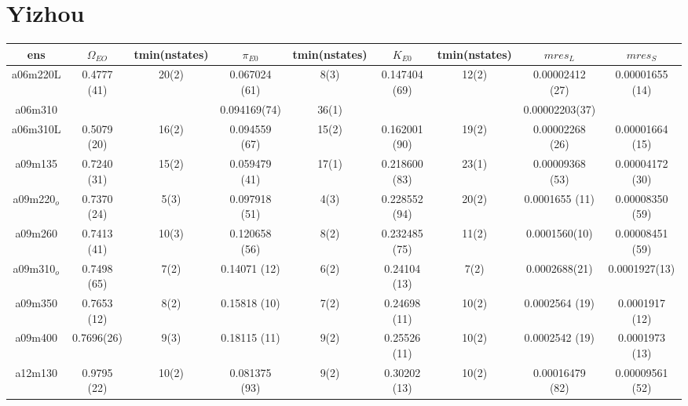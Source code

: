 \documentclass{article}
\begin{document}
 \section*{Yizhou}
\begin{table}[h!]
  \centering
 \setlength{\arrayrulewidth}{0.5mm}
\setlength{\tabcolsep}{13pt}
\renewcommand{\arraystretch}{2}
 \begin{tabular}{|| c |c | c | c | c | c | c | c | c ||} 
 \hline
 ens &  $\Omega_{EO}$ & tmin(nstates) & $\pi_{E0}$  & tmin(nstates)& $K_{E0}$  & tmin(nstates) & $mres_{L}$ & $mres_{S}$\\ [0.8ex] 
 \hline\hline
 a06m220L 
 & {0.4777 (41)}   &   {20(2)} & {0.067024 (61)}   & {8(3)}   & { 0.147404 (69)}  & {12(2)}   & { 0.00002412 (27)}  & { 0.00001655 (14)} \\ 
 \hline
 a06m310 
 & {}   &   {} & {0.094169(74)}   & {36(1)}   & {}  & {}   & {0.00002203(37)}  & {}  \\
 \hline
 a06m310L 
  & { 0.5079 (20)}   &   {16(2)} & {0.094559 (67)}   & {15(2)}   & { 0.162001 (90)}  & {19(2)}   & { 0.00002268 (26)}  & { 0.00001664 (15)}  \\
 \hline
 a09m135 
 & { 0.7240 (31)}   &   {15(2)} & {0.059479 (41)}   & {17(1)}   & {0.218600 (83)}  & {23(1)}   & {0.00009368 (53)}  & { 0.00004172 (30)}  \\
 \hline
 a09m220$_o$ 
 & {0.7370 (24)}   &   {5(3)} & { 0.097918 (51)}   & {4(3)}   & { 0.228552 (94)}  & {20(2)}   & {0.0001655 (11)}  & {0.00008350 (59)}  \\
 \hline
 a09m260
  & {0.7413 (41)}   &   {10(3)} & {0.120658 (56)}   & {8(2)}   & { 0.232485 (75)}  & {11(2)}   & {0.0001560(10)}  & {0.00008451 (59)}  \\
 \hline
 a09m310$_o$
 & {0.7498 (65)}   &   {7(2)} & {0.14071 (12)}   & {6(2)}   & {0.24104 (13)}  & {7(2)}   & {0.0002688(21)}  & {0.0001927(13)}  \\
 \hline
 a09m350 
  & { 0.7653 (12)}   &   {8(2)} & { 0.15818 (10)}   & {7(2)}   & {0.24698 (11)}  & {10(2)}   & { 0.0002564 (19)}  & {0.0001917 (12)}  \\
 \hline
 a09m400 
  & {0.7696(26)}   &   {9(3)} & {0.18115 (11)}   & {9(2)}   & {0.25526 (11)}  & {10(2)}   & {0.0002542 (19)}  & {0.0001973 (13)}  \\
 \hline
a12m130 
  & {0.9795 (22)}   &   {10(2)} & {0.081375 (93)}   & {9(2)}   & {0.30202 (13)}  & {10(2)}   & {0.00016479 (82)}  & { 0.00009561 (52)}  \\
 \hline

 
 \end{tabular}
\end{table}
\end{document}
